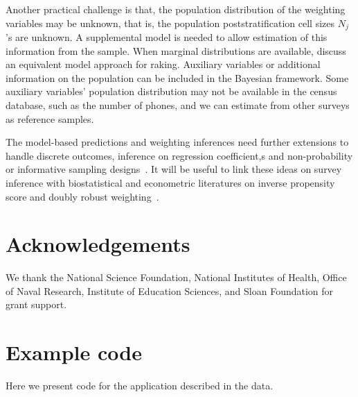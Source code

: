 \documentclass[11pt]{article}
\numberwithin{figure}{section}
\numberwithin{table}{section}
\numberwithin{equation}{section}
\begin{document}
Another practical challenge is that, the population distribution of the
weighting variables may be unknown, that is, the population poststratification
cell sizes $N_j$'s are unknown. A supplemental model is needed to allow
estimation of this information from the sample. When marginal distributions are
available, \cite{rake:little91} discuss an equivalent model approach for
raking. Auxiliary variables or additional information on the population can be
included in the Bayesian framework. Some auxiliary variables' population
distribution may not be available in the census database, such as the number of
phones, and we can estimate from other surveys as reference samples.

The model-based predictions and weighting inferences need further extensions to
handle discrete outcomes, inference on regression coefficient,s and
non-probability or informative sampling designs~\citep{Kim:Skinner:BM13}. It
will be useful to link these ideas on survey inference with biostatistical and
econometric literatures on inverse propensity score and doubly robust
weighting~\citep{kang:schafer07}.

\section*{Acknowledgements} We thank the National Science Foundation, National
Institutes of Health, Office of Naval Research, Institute of Education
Sciences, and Sloan Foundation for grant support.






\pagebreak

\appendix

\section{Example code}
\label{code}
Here we present code for the application described in the data.
\end{document}
